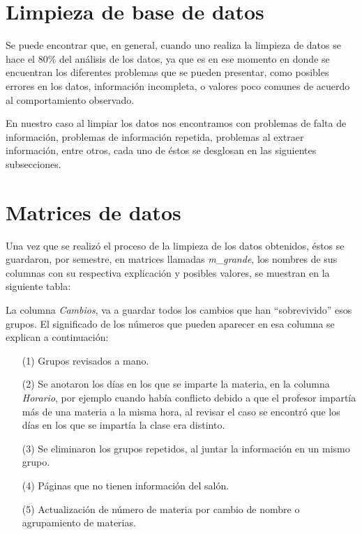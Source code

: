 \section{Limpieza de base de datos}

Se puede encontrar que, en general, cuando uno realiza la limpieza de datos se hace el 80\% del análisis de los datos, ya que es en ese momento en donde se encuentran los diferentes problemas que se pueden presentar, como posibles errores en los datos, información incompleta, o valores poco comunes de acuerdo al comportamiento observado.

En nuestro caso al limpiar los datos nos encontramos con problemas de falta de información, problemas de información repetida, problemas al extraer información, entre otros, cada uno de éstos se desglosan en las siguientes subsecciones.


\section{Matrices de datos}

Una vez que se realizó el proceso de la limpieza de los datos obtenidos, éstos se guardaron, por semestre, en matrices llamadas \textit{m\_grande}, los nombres de sus columnas con su respectiva explicación y posibles valores, se muestran en la siguiente tabla:

\dfNmatrizGrande %

La columna \textit{Cambios}, va a guardar todos los cambios que han ``sobrevivido'' esos grupos. El significado de los números que pueden aparecer en esa columna se explican a continuación:

\begin{enumerate}
\item[(1)] Grupos revisados a mano.

\item[(2)] Se anotaron los días en los que se imparte la materia, en la columna \textit{Horario}, por ejemplo cuando había conflicto debido a que el profesor impartía más de una materia a la misma hora, al revisar el caso se encontró que los días en los que se impartía la clase era distinto.

\item[(3)] Se eliminaron los grupos repetidos, al juntar la información en un mismo grupo.

\item[(4)] Páginas que no tienen información del salón.

\item[(5)] Actualización de número de materia por cambio de nombre o agrupamiento de materias.
\end{enumerate}
